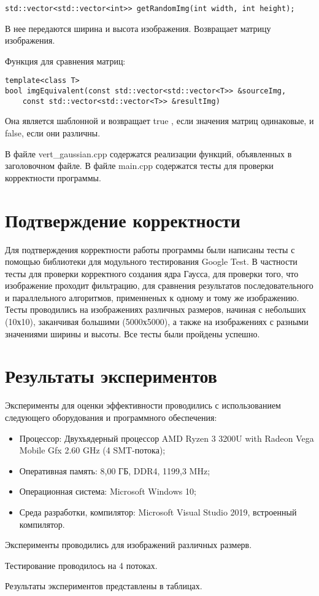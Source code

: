 \documentclass{report}
\begin{document}
\begin{lstlisting}
std::vector<std::vector<int>> getRandomImg(int width, int height);
\end{lstlisting}
\par В нее передаются ширина и высота изображения. Возвращает матрицу изображения.
\par Функция для сравнения матриц:
\begin{lstlisting}
template<class T>
bool imgEquivalent(const std::vector<std::vector<T>> &sourceImg,
    const std::vector<std::vector<T>> &resultImg)
\end{lstlisting}
\par Она является шаблонной и возвращает  true , если значения матриц одинаковые, и  false, если они различны.
\par В файле vert\_gaussian.cpp содержатся реализации функций, объявленных в заголовочном файле. В файле main.cpp содержатся тесты для проверки корректности программы.
\newpage

\section*{Подтверждение корректности}
Для подтверждения корректности работы программы были написаны тесты с помощью библиотеки для модульного тестирования Google Test. В частности тесты для проверки корректного создания ядра Гаусса, для проверки того, что изображение проходит фильтрацию, для сравнения результатов последовательного и параллельного алгоритмов, применненых к одному и тому же изображению. Тесты проводились на изображениях различных размеров, начиная с небольших (10х10), заканчивая большими (5000х5000), а также на изображениях с разными значениями ширины и высоты. Все тесты были пройдены успешно.
\newpage

\section*{Результаты экспериментов}
\par Эксперименты для оценки эффективности проводились с использованием следующего оборудования и программного обеспечения:
\begin{itemize}
\item Процессор: Двухъядерный процессор AMD Ryzen 3 3200U with Radeon Vega Mobile Gfx 2.60 GHz (4 SMT-потока);
\item Оперативная память: 8,00 ГБ, DDR4, 1199,3 MHz;
\item Операционная система: Microsoft Windows 10;
\item Среда разработки, компилятор: Microsoft Visual Studio 2019, встроенный компилятор.
\end{itemize}
\par Эксперименты проводились для изображений различных размерв.
\par Тестирование проводилось на 4 потоках.
\par Результаты экспериментов представлены в таблицах.
\end{document}
